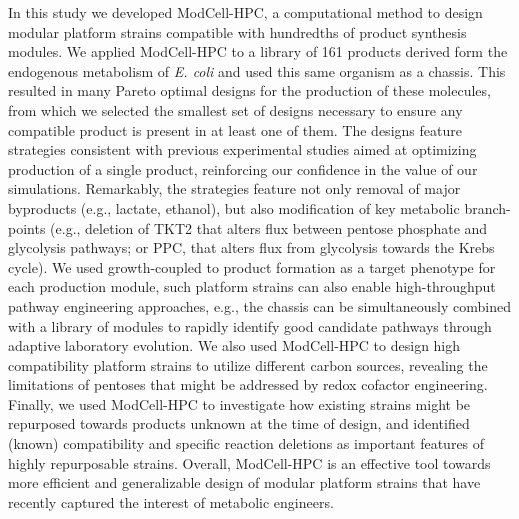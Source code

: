 {%
%
%
%
%
%

In this study we developed ModCell-HPC, a computational method to design modular platform strains compatible with hundredths of product synthesis modules.
We applied ModCell-HPC to a library of 161 products derived form the endogenous metabolism of \textit{E. coli} and used this same organism as a chassis.
This resulted in many Pareto optimal designs for the production of these molecules, from which we selected the smallest set of designs necessary to ensure any compatible product is present in at least one of them.
The designs feature strategies consistent with previous experimental studies aimed at optimizing production of a single product, reinforcing our confidence in the value of our simulations.
Remarkably, the strategies feature not only removal of major byproducts (e.g., lactate, ethanol), but also modification of key metabolic branch-points (e.g., deletion of TKT2 that alters flux between pentose phosphate and glycolysis pathways; or PPC, that alters flux from glycolysis towards the Krebs cycle).
We used growth-coupled to product formation as a target phenotype for each production module,
such platform strains can also enable high-throughput pathway engineering approaches, e.g., the chassis can be simultaneously combined with a library of modules to rapidly identify good candidate pathways through adaptive laboratory evolution.
We also used ModCell-HPC to design high compatibility platform strains to utilize different carbon sources, revealing the limitations of pentoses that might be addressed by redox cofactor engineering.
Finally, we used ModCell-HPC to investigate how existing strains might be repurposed towards products unknown at the time of design, and identified (known) compatibility and specific reaction deletions as important features of highly repurposable strains.
Overall, ModCell-HPC is an effective tool towards more efficient and generalizable design of modular platform strains that have recently captured the interest of metabolic engineers. \citep{nielsen2016}


}
